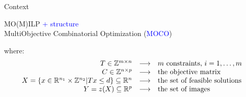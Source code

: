 \documentclass[10pt,xcolor=dvipsnames]{beamer}
\newcommand{\mR}{\mathbb{R}}
\newcommand{\mZ}{\mathbb{Z}}
\newcommand{\red}{\textcolor{red}}
\newcommand{\blue}{\textcolor{blue}}
\begin{document}
\begin{frame}{Context}
\begin{center}
MO(M)ILP \blue{+ structure}\\
MultiObjective Combinatorial Optimization (\blue{MOCO})
\end{center}
\vspace{2mm}
\noindent 
where:
\vspace{-6mm}
$$
\begin{array}{rcl}
T \in \mZ^{m \times n} & \longrightarrow & m \hbox{ constraints, } i = 1,\ldots,m\\
%
C \in \mZ^{n\times p} & \longrightarrow & \hbox{the objective matrix}\\
%
X=\{x \in \mR^{n_1} \times \mZ^{n_2}| Tx\leq d\}\subseteq\mR^n  & \longrightarrow & \hbox{the set of feasible solutions}\\
Y=z(X)\subseteq \mR^p & \longrightarrow & \hbox{the set of images}\\
\notag
\end{array}
$$


\end{frame}
\end{document}
